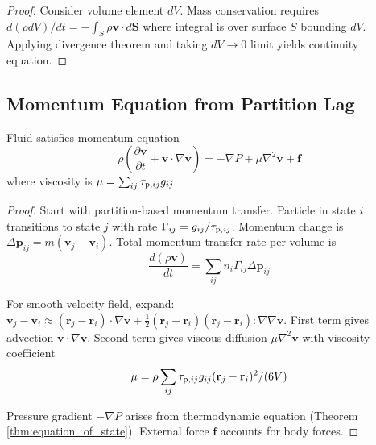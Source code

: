 \begin{proof}
Consider volume element $dV$. Mass conservation requires $d(\rho dV)/dt = -\int_{S} \rho\mathbf{v} \cdot d\mathbf{S}$ where integral is over surface $S$ bounding $dV$. Applying divergence theorem and taking $dV \to 0$ limit yields continuity equation.
\end{proof}

\subsection{Momentum Equation from Partition Lag}

\begin{theorem}
\label{thm:navier_stokes}
Fluid satisfies momentum equation
\begin{equation}
\rho\left(\frac{\partial\mathbf{v}}{\partial t} + \mathbf{v} \cdot \nabla\mathbf{v}\right) = -\nabla P + \mu \nabla^2 \mathbf{v} + \mathbf{f}
\end{equation}
where viscosity is $\mu = \sum_{ij} \tau_{\mathrm{p},ij} g_{ij}$.
\end{theorem}

\begin{proof}
Start with partition-based momentum transfer. Particle in state $i$ transitions to state $j$ with rate $\Gamma_{ij} = g_{ij}/\tau_{\mathrm{p},ij}$. Momentum change is $\Delta\mathbf{p}_{ij} = m(\mathbf{v}_j - \mathbf{v}_i)$. Total momentum transfer rate per volume is
\begin{equation}
\frac{d(\rho\mathbf{v})}{dt} = \sum_{ij} n_i \Gamma_{ij} \Delta\mathbf{p}_{ij}
\end{equation}

For smooth velocity field, expand: $\mathbf{v}_j - \mathbf{v}_i \approx (\mathbf{r}_j - \mathbf{r}_i) \cdot \nabla\mathbf{v} + \tfrac{1}{2}(\mathbf{r}_j - \mathbf{r}_i)(\mathbf{r}_j - \mathbf{r}_i) : \nabla\nabla\mathbf{v}$. First term gives advection $\mathbf{v} \cdot \nabla\mathbf{v}$. Second term gives viscous diffusion $\mu\nabla^2\mathbf{v}$ with viscosity coefficient
\begin{equation}
\mu = \rho \sum_{ij} \tau_{\mathrm{p},ij} g_{ij} (\mathbf{r}_j - \mathbf{r}_i)^2/(6V)
\end{equation}

Pressure gradient $-\nabla P$ arises from thermodynamic equation (Theorem \ref{thm:equation_of_state}). External force $\mathbf{f}$ accounts for body forces.
\end{proof}

